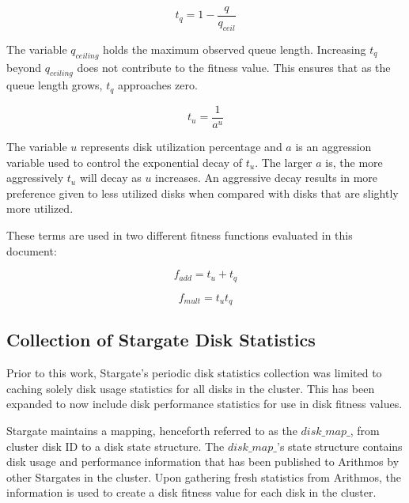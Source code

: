 \documentclass[12pt]{article}
\begin{document}
  \begin{equation}
    t_{q} = 1 - \frac{q}{q_{ceil}}
  \end{equation}

  The variable $q_{ceiling}$ holds the maximum observed queue length.
  Increasing $t_{q}$ beyond $q_{ceiling}$ does not contribute to the fitness
  value. This ensures that as the queue length grows, $t_{q}$ approaches zero. 

  \begin{equation}
    t_{u} = \frac{1}{a^{u}}
  \end{equation}

  The variable $u$ represents disk utilization percentage and $a$ is an
  aggression variable used to control the exponential decay of $t_{u}$. The
  larger $a$ is, the more aggressively $t_{u}$ will decay as $u$ increases. An
  aggressive decay results in more preference given to less utilized disks when
  compared with disks that are slightly more utilized.

  These terms are used in two different fitness functions evaluated in this
  document:

  \begin{equation} \label{eqn:additive-fitness}
    f_{add} = t_{u} + t_{q}
  \end{equation}

  \begin{equation} \label{eqn:multiplicative-fitness}
    f_{mult} = t_{u}t_{q}
  \end{equation}


  \subsection{Collection of Stargate Disk Statistics }

  Prior to this work, Stargate's periodic disk statistics collection was limited to
  caching solely disk usage statistics for all disks in the cluster. This has been
  expanded to now include disk performance statistics for use in disk fitness
  values.

  Stargate maintains a mapping, henceforth referred to as the $disk\_map\_$,
  from cluster disk ID to a disk state structure. The $disk\_map\_$'s state
  structure contains disk usage and performance information that has been
  published to Arithmos by other Stargates in the cluster. Upon gathering fresh
  statistics from Arithmos, the information is used to create a disk fitness value
  for each disk in the cluster.
\end{document}

